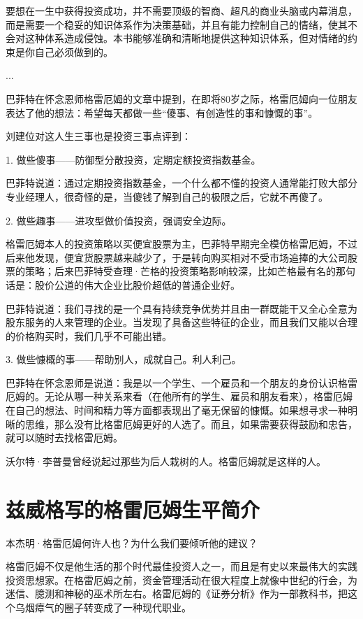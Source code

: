 \documentclass[12pt,oneside]{book}
\begin{document}
要想在一生中获得投资成功，并不需要顶级的智商、超凡的商业头脑或内幕消息，而是需要一个稳妥的知识体系作为决策基础，并且有能力控制自己的情绪，使其不会对这种体系造成侵蚀。本书能够准确和清晰地提供这种知识体系，但对情绪的约束是你自己必须做到的。

...

巴菲特在怀念恩师格雷厄姆的文章中提到，在即将80岁之际，格雷厄姆向一位朋友表达了他的想法：希望每天都做一些“傻事、有创造性的事和慷慨的事”。

刘建位对这人生三事也是投资三事点评到：

1. 做些傻事——防御型分散投资，定期定额投资指数基金。

巴菲特说道：通过定期投资指数基金，一个什么都不懂的投资人通常能打败大部分专业经理人，很奇怪的是，当傻钱了解到自己的极限之后，它就不再傻了。

2. 做些趣事——进攻型做价值投资，强调安全边际。

格雷厄姆本人的投资策略以买便宜股票为主，巴菲特早期完全模仿格雷厄姆，不过后来他发现，便宜货股票越来越少了，于是转向购买相对不受市场追捧的大公司股票的策略；后来巴菲特受查理·芒格的投资策略影响较深，比如芒格最有名的那句话是：股价公道的伟大企业比股价超低的普通企业好。

巴菲特说道：我们寻找的是一个具有持续竞争优势并且由一群既能干又全心全意为股东服务的人来管理的企业。当发现了具备这些特征的企业，而且我们又能以合理的价格购买时，我们几乎不可能出错。


3. 做些慷概的事——帮助别人，成就自己。利人利己。

巴菲特在怀念恩师是说道：我是以一个学生、一个雇员和一个朋友的身份认识格雷厄姆的。无论从哪一种关系来看（在他所有的学生、雇员和朋友看来），格雷厄姆在自己的想法、时间和精力等方面都表现出了毫无保留的慷慨。如果想寻求一种明晰的思维，那么没有比格雷厄姆更好的人选了。而且，如果需要获得鼓励和忠告，就可以随时去找格雷厄姆。

沃尔特·李普曼曾经说起过那些为后人栽树的人。格雷厄姆就是这样的人。

\section{兹威格写的格雷厄姆生平简介}
本杰明·格雷厄姆何许人也？为什么我们要倾听他的建议？

格雷厄姆不仅是他生活的那个时代最佳投资人之一，而且是有史以来最伟大的实践投资思想家。在格雷厄姆之前，资金管理活动在很大程度上就像中世纪的行会，为迷信、臆测和神秘的巫术所左右。格雷厄姆的《证券分析》作为一部教科书，把这个乌烟瘴气的圈子转变成了一种现代职业。
\end{document}
